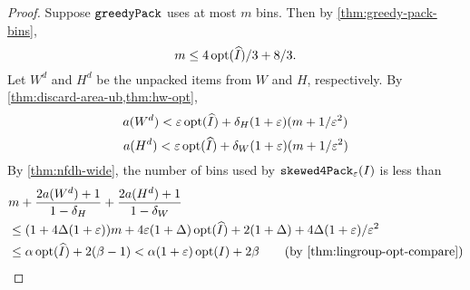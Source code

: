 \rthmThinGPackAppx*
\begin{proof}
Suppose $\operatorname{\mathtt{greedyPack}}$ uses at most $m$ bins. Then by \cref{thm:greedy-pack-bins},
\[ m \le 4\operatorname{opt}(\widehat{I})/3 + 8/3. \]
Let $W^d$ and $H^d$ be the unpacked items from $W$ and $H$, respectively.
By \cref{thm:discard-area-ub,thm:hw-opt},
\[ a(W^d) < \varepsilon\operatorname{opt}(\widehat{I}) + \delta_H(1 + \varepsilon)(m + 1/\varepsilon^2) \]
\[ a(H^d) < \varepsilon\operatorname{opt}(\widehat{I}) + \delta_W(1 + \varepsilon)(m + 1/\varepsilon^2) \]
By \cref{thm:nfdh-wide}, the number of bins used by $\operatorname{\mathtt{skewed4Pack}}_{\varepsilon}(I)$ is less than
\begin{align*}
& m + \frac{2a(W^d)+1}{1-\delta_H} + \frac{2a(H^d)+1}{1-\delta_W}
\\ &\le (1 + 4\Delta(1+\eps))m + 4\eps(1+\Delta)\opt(\Ihat)
    + 2(1+\Delta) + 4\Delta(1+\eps)/\eps^2
\\ &\le \alpha\opt(\Ihat) + 2(\beta - 1)
< \alpha(1+\eps)\opt(I) + 2\beta
\tag{by \cref{thm:lingroup-opt-compare}}
\end{align*}
\end{proof}
